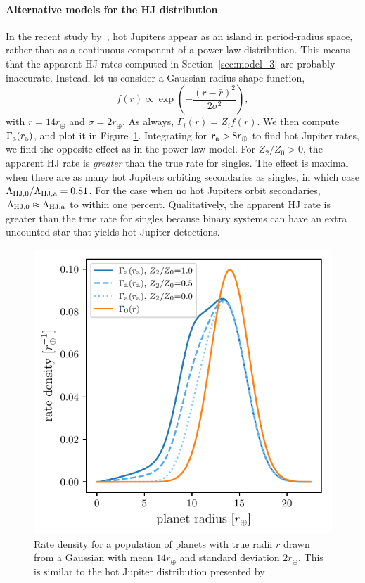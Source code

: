 \documentclass[12pt,modern]{aastex61}
\renewcommand{\a}{_{\rm a}}
\begin{document}
\paragraph{Alternative models for the HJ distribution}

In the recent study by~\citet{petigura_CKS_2017}, hot Jupiters appear
as an island in period-radius space, rather than as a continuous
component of a power law distribution.  This means that the apparent
HJ rates computed in Section~\ref{sec:model_3} are probably
inaccurate.  Instead, let us consider a Gaussian radius shape
function,
\begin{equation}
    f(r) \propto \exp \left( -\frac{(r-\bar{r})^2}{2\sigma^2} \right),
\end{equation}
with $\bar{r} = 14r_\oplus$ and $\sigma = 2r_\oplus$.  As always,
$\Gamma_i(r) = Z_i f(r)$.  We then compute $\Gamma\a(r\a)$, and plot
it in Figure~\ref{fig:gaussian_HJ}.  Integrating for $r\a > 8r_\oplus$
to find hot Jupiter rates, we find the opposite effect as in the power
law model.  For $Z_2/Z_0>0$, the apparent HJ rate is {\it greater}
than the true rate for singles.  The effect is maximal when there are
as many hot Jupiters orbiting secondaries as singles, in which case
$\Lambda_{{\rm HJ},0}/\Lambda_{\rm HJ,a} = 0.81$.
For the case when no hot Jupiters orbit secondaries, $\Lambda_{{\rm
HJ},0} \approx \Lambda_{\rm HJ,a}$ to within one percent.
Qualitatively, the apparent HJ rate is greater than the true rate for
singles because binary systems can have an extra uncounted star that
yields hot Jupiter detections.


\begin{figure}[!tb]
    \centering
    \includegraphics[width=.6\textwidth]{figures/int_rate_density_vs_radius_model_7_rpu_22.5_manyZs.pdf}
    \caption{
        Rate density for a population of planets with true radii $r$
        drawn from a Gaussian with mean $14r_\oplus$ and standard
        deviation $2r_\oplus$.  This is similar to the hot Jupiter
        distribution presented by~\citet{petigura_CKS_2017}.
    }
    \label{fig:gaussian_HJ}
\end{figure}
\end{document}
